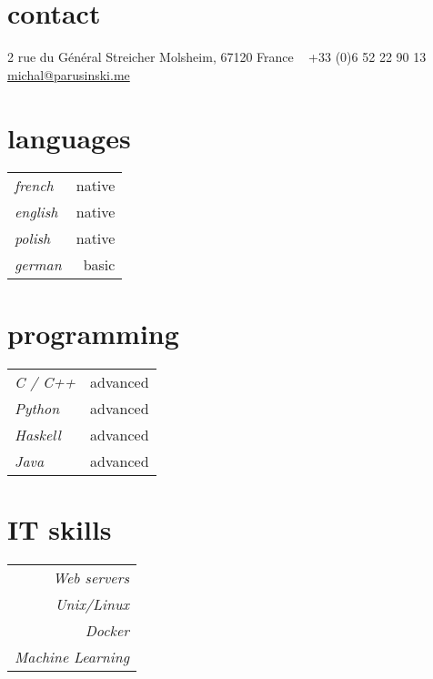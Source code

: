 \documentclass[]{friggeri-cv} %
\begin{document}


\begin{aside} %
\section{contact}
2 rue du Général Streicher
Molsheim, 67120
France
~
+33 (0)6 52 22 90 13
~
\href{mailto:michal@parusinski.me}{michal@parusinski.me}
\section{languages}
    {\def\arraystretch{0.3}%
    \begin{tabular}{l r}
        \emph{french} & native \\
        \emph{english} & native \\
        \emph{polish} & native \\
        \emph{german} & basic \\
    \end{tabular}%
    }
\section{programming}
    {\def\arraystretch{0.3}%
    \begin{tabular}{l r}
        \emph{C / C++} & advanced \\
        \emph{Python} & advanced \\
        \emph{Haskell} & advanced \\
        \emph{Java} & advanced
    \end{tabular}%
    }
\section{IT skills}
    {\def\arraystretch{0.3}%
    \begin{tabular}{ r }
        \emph{Web servers} \\
        \emph{Unix/Linux} \\
        \emph{Docker} \\
        \emph{Machine Learning} \\
    \end{tabular}%
    }
\end{aside}
\end{document}
